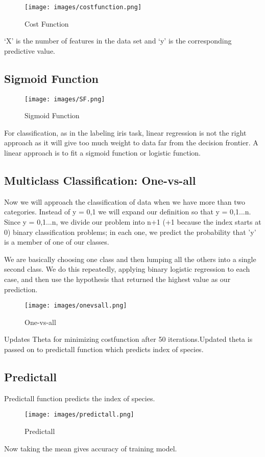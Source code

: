 \documentclass[11pt,letterpaper]{article}
\begin{document}
\begin{figure}[ht]
\centering
\label{fig:costfunction}
\graphicspath{ {images/} }
\texttt{[image: images/costfunction.png]}
\caption{Cost Function}
\end{figure}
‘X’ is the number of features in the data set and ‘y’ is the corresponding predictive value.

\subsection{Sigmoid Function}
\begin{figure}[h!]
\centering
\label{fig:sigmoid}
\graphicspath{ {images/} }
\texttt{[image: images/SF.png]}
\caption{Sigmoid Function}
\end{figure}

For classification, as in the labeling iris task, linear regression is not the right approach as it will give too much weight to data far from the decision frontier. A linear approach is to fit a sigmoid function or logistic function.


\bigskip
\bigskip



\subsection{Multiclass Classification: One-vs-all}
Now we will approach the classification of data when we have more than two categories. Instead of y = {0,1} we will expand our definition so that y = {0,1...n}.
Since y = {0,1...n}, we divide our problem into n+1 (+1 because the index starts at 0) binary classification problems; in each one, we predict the probability that 'y' is a member of one of our classes.

We are basically choosing one class and then lumping all the others into a single second class. We do this repeatedly, applying binary logistic regression to each case, and then use the hypothesis that returned the highest value as our prediction.


\begin{figure}[!h]
\centering
\label{fig:onevsall}
\graphicspath{ {images/} }
\texttt{[image: images/onevsall.png]}
\caption{One-vs-all}
\end{figure}

Updates Theta for minimizing costfunction after 50 iterations.Updated theta is passed on to predictall function which predicts index of species.

\subsection{Predictall}
Predictall function predicts the index of species.
\begin{figure}[!h]
\centering
\label{fig:predictall}
\graphicspath{ {images/} }
\texttt{[image: images/predictall.png]}
\caption{Predictall}
\end{figure}

Now taking the mean gives accuracy of training model.
\end{document}
